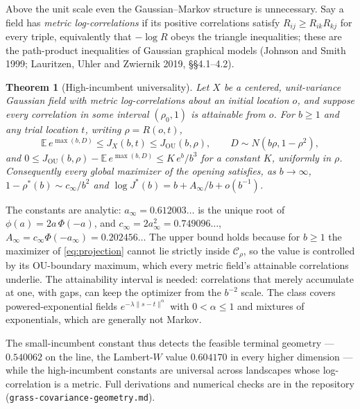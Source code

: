 \documentclass[11pt]{article}
\theoremstyle{itheads}
\newtheorem{theorem}{Theorem}
\newcommand{\E}{\mathbb{E}}
\begin{document}
Above the unit scale even the Gaussian--Markov structure is
unnecessary. Say a field has \emph{metric log-correlations} if its
positive correlations satisfy $R_{ij}\ge R_{ik}R_{kj}$ for every triple,
equivalently that $-\log R$ obeys the triangle inequalities; these are
the path-product inequalities of Gaussian graphical models (Johnson and
Smith 1999; Lauritzen, Uhler and Zwiernik 2019, \S\S4.1--4.2).

\begin{theorem}[High-incumbent universality]\label{thm:universal}
Let $X$ be a centered, unit-variance Gaussian field with metric
log-correlations about an initial location $o$, and suppose every
correlation in some interval $(\rho_0,1)$ is attainable from $o$. For
$b\ge 1$ and any trial location $t$, writing $\rho=R(o,t)$,
\begin{equation}\label{eq:sandwich}
\E\,e^{\max(b,D)}\le J_X(b,t)\le J_{\mathrm{OU}}(b,\rho),
\qquad D\sim N\!\left(b\rho,1-\rho^{2}\right),
\end{equation}
and $0\le J_{\mathrm{OU}}(b,\rho)-\E\,e^{\max(b,D)}\le K\,e^{b}/b^{3}$
for a constant $K$, uniformly in $\rho$. Consequently every global
maximizer of the opening satisfies, as $b\to\infty$,
$1-\rho^{*}(b)\sim c_\infty/b^{2}$ and
$\log J^{*}(b)=b+A_\infty/b+o(b^{-1})$.
\end{theorem}

\noindent The constants are analytic: $a_\infty=0.612003\ldots$ is the
unique root of $\phi(a)=2a\,\Phi(-a)$, and
$c_\infty=2a_\infty^{2}=0.749096\ldots$,
$A_\infty=c_\infty\Phi(-a_\infty)=0.202456\ldots$ The upper bound holds
because for $b\ge 1$ the maximizer of \eqref{eq:projection} cannot lie
strictly inside $\mathcal{C}_\rho$, so the value is controlled by its
OU-boundary maximum, which every metric field's attainable correlations
underlie. The attainability interval is needed: correlations that merely
accumulate at one, with gaps, can keep the optimizer from the $b^{-2}$
scale. The class covers powered-exponential fields
$e^{-\lambda\|s-t\|^{\alpha}}$ with $0<\alpha\le 1$ and mixtures of
exponentials, which are generally not Markov.

The small-incumbent constant thus detects the feasible terminal
geometry --- $0.540062$ on the line, the Lambert-$W$ value $0.604170$ in
every higher dimension --- while the high-incumbent constants are
universal across landscapes whose log-correlation is a metric. Full
derivations and numerical checks are in the repository
(\texttt{grass-covariance-geometry.md}).
\end{document}
